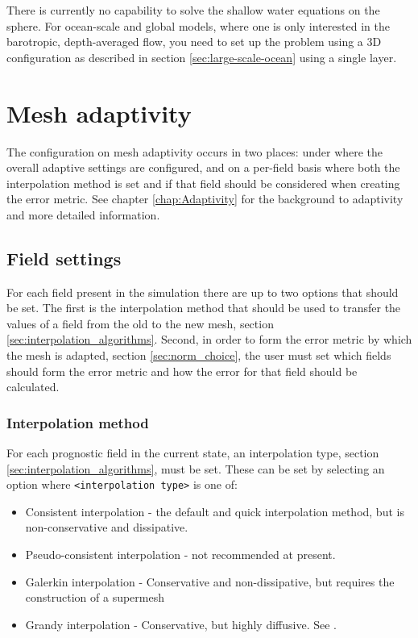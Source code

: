 There is currently no capability to solve the shallow water equations on the
sphere. For ocean-scale and global models, where one is only interested in the
barotropic, depth-averaged flow, you need to set up the problem using a 3D
configuration as described in section \ref{sec:large-scale-ocean} using a
single layer.

\section{Mesh adaptivity} \label{sec:config_adapt}

The configuration on mesh adaptivity occurs in two places: under  where 
the overall adaptive settings are configured, and on a per-field basis where both the interpolation
method is set and if that field should be considered when creating the error metric. See chapter 
\ref{chap:Adaptivity} for the background to adaptivity and more detailed information.

\subsection{Field settings}

For each field present in the simulation there are up to two options that should be set. The first
is the interpolation method that should be used to transfer the values of a field from the old to the new mesh, section \ref{sec:interpolation_algorithms}.
Second, in order to form the error metric by which the mesh is adapted, section \ref{sec:norm_choice}, the user must set which fields
should form the error metric and how the error for that field should be calculated.

\subsubsection{Interpolation method} \label{sec:config_adapt_interp}

For each prognostic field in the current state, an interpolation type, section \ref{sec:interpolation_algorithms}, must be set. These can be set by selecting an
option  where \texttt{<interpolation type>} is one of:
\begin{itemize}
\item Consistent interpolation - the default and quick interpolation method, but is non-conservative and dissipative.
\item Pseudo-consistent interpolation - not recommended at present.
\item Galerkin interpolation - Conservative and non-dissipative, but requires the construction of a supermesh \citep{farrell2009a,farrell2010a}
\item Grandy interpolation - Conservative, but highly diffusive. See \citet{grandy1999}.
\end{itemize}


